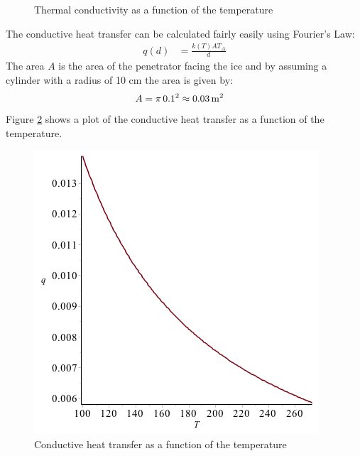\begin{figure}[htb]
	\centering
	\caption{Thermal conductivity as a function of the temperature}
	\label{fig:T_vs_k}
\end{figure}
The conductive heat transfer can be calculated fairly easily using Fourier's Law\cite{website:conductiveHeatTransfer}:
\begin{align}
	q(d) &= \frac{k(T) A T_\Delta}{d}
\end{align}
The area $A$ is the area of the penetrator facing the ice and by assuming a cylinder with a radius of 10 cm the area is given by:
\begin{align}
	A &= \pi \, 0.1^2 \approx \unit[0.03]{m^2}
\end{align}
Figure \ref{fig:T_vs_q} shows a plot of the conductive heat transfer as a function of the temperature.
\begin{figure}[htb]
	\centering
	\includegraphics[width=.48\textwidth]{figures/temperature/T_vs_q}
	\caption{Conductive heat transfer as a function of the temperature}
	\label{fig:T_vs_q}
\end{figure}
